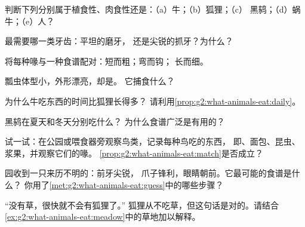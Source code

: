 \begin{exercise}[$\star$]\label{exo:g2:what-animals-eat:2}
判断下列分别属于植食性、肉食性还是：（a）牛；（b）狐狸；（c）
黑鸫；（d）蜗牛；（e）人？
\end{exercise}

\begin{exercise}[$\star$]\label{exo:g2:what-animals-eat:3}
最需要哪一类牙齿：平坦的磨牙，
还是尖锐的抓牙？为什么？
\end{exercise}

\begin{exercise}[$\star$]\label{exo:g2:what-animals-eat:4}
将每种喙与一种食谱配对：短而粗；弯而钩；
长而细。
\end{exercise}

\begin{exercise}[$\star$]\label{exo:g2:what-animals-eat:5}
瓢虫体型小，外形漂亮，却是。
它捕食什么？
\end{exercise}

\begin{exercise}[$\star$]\label{exo:g2:what-animals-eat:6}
为什么牛吃东西的时间比狐狸长得多？
请利用\cref{prop:g2:what-animals-eat:daily}。
\end{exercise}

\begin{exercise}[$\star$]\label{exo:g2:what-animals-eat:7}
黑鸫在夏天和冬天分别吃什么？
为什么食谱广泛是有用的？
\end{exercise}

\begin{exercise}[$\star$]\label{exo:g2:what-animals-eat:8}
试一试：在公园或喂食器旁观察鸟类，记录每种鸟吃的东西，
即、面包、昆虫、浆果，并观察它们的喙。
\cref{prop:g2:what-animals-eat:match}是否成立？
\end{exercise}

\begin{exercise}[$\star\star$]\label{exo:g2:what-animals-eat:9}
园收到一只来历不明的：前牙尖锐，
爪子锋利，眼睛朝前。它最可能的食谱是什么？
你用了\cref{met:g2:what-animals-eat:guess}中的哪些步骤？
\end{exercise}

\begin{exercise}[$\star\star$]\label{exo:g2:what-animals-eat:10}
“没有草，很快就不会有狐狸了。”
狐狸从不吃草，但这句话是对的。请结合
\cref{ex:g2:what-animals-eat:meadow}中的草地加以解释。
\end{exercise}
